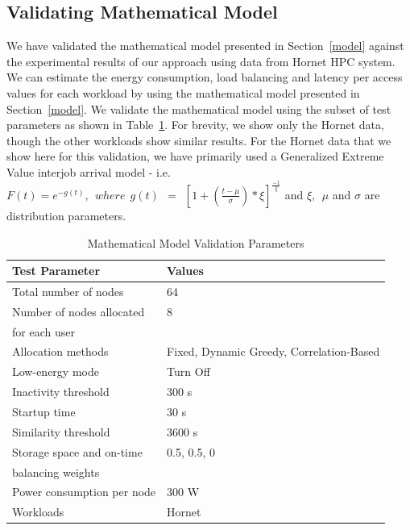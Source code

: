 \documentclass[preprint,12pt]{elsarticle}
\begin{document}
\subsection{Validating Mathematical Model}
\label{validate_model}
We have validated the mathematical model presented in Section~\ref{model} against the
experimental results of our approach using data from Hornet HPC system. We can estimate the energy
consumption, load balancing and latency per access values for each workload
by using the mathematical model presented in Section~\ref{model}. We validate
the mathematical model using the subset of test parameters as shown in
Table~\ref{tbl:validate_params}.
For brevity, we show only the Hornet data, though the other workloads show similar results.
For the Hornet data that we show here for this validation, we have primarily used a Generalized
Extreme Value interjob arrival model - i.e.
$F(t) = e^{-g(t)},\ \ where\ \ g(t)\ \ =\ \ [{1 + (\frac{t - \mu}{\sigma}) * \xi}]^{\frac{-1}{\xi}}$
and $\xi,\ \ \mu$ and $\sigma$ are distribution parameters.

\begin{table}[!htbp]
 \begin{center}
  \begin{tabular}{|l|l|} \hline
Test Parameter & Values \\ \hline
Total number of nodes          & 64 \\ \hline
Number of nodes allocated        & 8 \\
for each user              & \\ \hline
Allocation methods           & Fixed, Dynamic Greedy, Correlation-Based \\ \hline
Low-energy mode             & Turn Off \\ \hline
Inactivity threshold          & 300 s \\ \hline
Startup time              & 30 s \\ \hline
Similarity threshold          & 3600 s \\ \hline
Storage space and on-time        & 0.5, 0.5, 0 \\
balancing weights            & \\ \hline
Power consumption per node       & 300 W \\ \hline
Workloads                        & Hornet \\ \hline
  \end{tabular}
 \end{center}
 \caption{Mathematical Model Validation Parameters}
 \label{tbl:validate_params}
\end{table}
\end{document}

